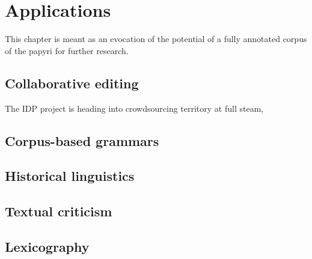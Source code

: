 \chapter{Applications} %
\label{cha:applications}
This chapter is meant as an evocation of the potential of a fully annotated corpus of the papyri for further research.

\section{Collaborative editing} %
\label{sec:collaborativeediting}
The IDP project is heading into crowdsourcing territory at full steam, 

\section{Corpus-based grammars} %
\label{sec:corpusbasedgrammars}


\section{Historical linguistics} %
\label{sec:histlinguistics}



\section{Textual criticism} %
\label{sec:textualcriticism}


\section{Lexicography} %
\label{sec:lexicography}



